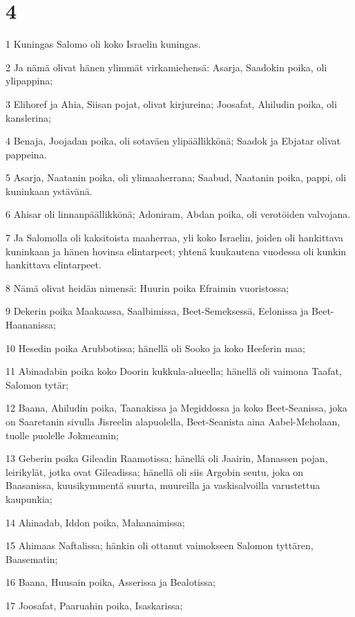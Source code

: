 \chapter{4}

\par 1 Kuningas Salomo oli koko Israelin kuningas.
\par 2 Ja nämä olivat hänen ylimmät virkamiehensä: Asarja, Saadokin poika, oli ylipappina;
\par 3 Elihoref ja Ahia, Siisan pojat, olivat kirjureina; Joosafat, Ahiludin poika, oli kanslerina;
\par 4 Benaja, Joojadan poika, oli sotaväen ylipäällikkönä; Saadok ja Ebjatar olivat pappeina.
\par 5 Asarja, Naatanin poika, oli ylimaaherrana; Saabud, Naatanin poika, pappi, oli kuninkaan ystävänä.
\par 6 Ahisar oli linnanpäällikkönä; Adoniram, Abdan poika, oli verotöiden valvojana.
\par 7 Ja Salomolla oli kaksitoista maaherraa, yli koko Israelin, joiden oli hankittava kuninkaan ja hänen hovinsa elintarpeet; yhtenä kuukautena vuodessa oli kunkin hankittava elintarpeet.
\par 8 Nämä olivat heidän nimensä: Huurin poika Efraimin vuoristossa;
\par 9 Dekerin poika Maakaassa, Saalbimissa, Beet-Semeksessä, Eelonissa ja Beet-Haananissa;
\par 10 Hesedin poika Arubbotissa; hänellä oli Sooko ja koko Heeferin maa;
\par 11 Abinadabin poika koko Doorin kukkula-alueella; hänellä oli vaimona Taafat, Salomon tytär;
\par 12 Baana, Ahiludin poika, Taanakissa ja Megiddossa ja koko Beet-Seanissa, joka on Saaretanin sivulla Jisreelin alapuolella, Beet-Seanista aina Aabel-Meholaan, tuolle puolelle Jokmeamin;
\par 13 Geberin poika Gileadin Raamotissa; hänellä oli Jaairin, Manassen pojan, leirikylät, jotka ovat Gileadissa; hänellä oli siis Argobin seutu, joka on Baasanissa, kuusikymmentä suurta, muureilla ja vaskisalvoilla varustettua kaupunkia;
\par 14 Ahinadab, Iddon poika, Mahanaimissa;
\par 15 Ahimaas Naftalissa; hänkin oli ottanut vaimokseen Salomon tyttären, Baasematin;
\par 16 Baana, Huusain poika, Asserissa ja Bealotissa;
\par 17 Joosafat, Paaruahin poika, Isaskarissa;
